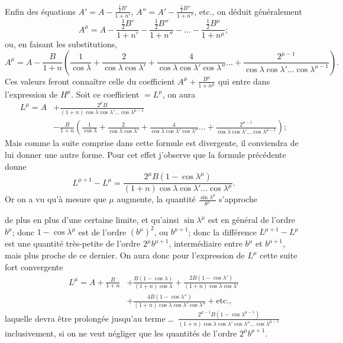 \documentclass{article}
\begin{document}
Enfin des équations $A'=A-\frac{\frac{1}{2}B'}{1+n'}$, $A''=A'-\frac{\frac{1}{2}B''}{1+n''}$, etc., on déduit généralement
\[ A^{\mu}=A-\frac{\tfrac{1}{2}B'}{1+n'}-\frac{\tfrac{1}{2}B''}{1+n''}-\ldots-\frac{\tfrac{1}{2}B^{\mu}}{1+n^{\mu}}; \]
ou, en faisant les substitutions,
\[ A^{\mu}=A-\frac{B}{1+n}\left(\frac{1}{\cos\lambda}+\frac{2}{\cos\lambda\cos\lambda'}+\frac{4}{\cos\lambda\cos\lambda'\cos\lambda''}\ldots+\frac{2^{\mu-1}}{\cos\lambda\cos\lambda'\ldots\cos\lambda^{\mu-1}}\right). \]
Ces valeurs feront connaître celle du coefficient $A^{\mu}+\frac{B^{\mu}}{1+n^{\mu}}$ qui entre dans l'expression de $H^{\mu}$. Soit ce coefficient $=L^{\mu}$, on aura
\[ \begin{aligned} L^{\mu}=A&+\frac{2^{\mu}B}{(1+n)\cos\lambda\cos\lambda'\ldots\cos\lambda^{\mu-1}}\\ &-\frac{B}{1+n}\left(\frac{1}{\cos\lambda}+\frac{2}{\cos\lambda\cos\lambda'}+\frac{4}{\cos\lambda\cos\lambda'\cos\lambda''}\ldots+\frac{2^{\mu-1}}{\cos\lambda\cos\lambda'\ldots\cos\lambda^{\mu-1}}\right); \end{aligned} \]
Mais comme la suite comprise dans cette formule est divergente, il conviendra de lui donner une autre forme. Pour cet effet j'observe que la formule précédente donne
\[ L^{\mu+1}-L^{\mu}=\frac{2^{\mu}B(1-\cos\lambda^{\mu})}{(1+n)\cos\lambda\cos\lambda'\ldots\cos\lambda^{\mu}}. \]
Or on a vu qu'à mesure que $\mu$ augmente, la quantité $\frac{\sin\lambda^{\mu}}{b^{\mu}}$ s'approche

de plus en plus d'une certaine limite, et qu'ainsi $\sin\lambda^{\mu}$ est en général de l'ordre $b^{\mu}$; donc $1-\cos\lambda^{\mu}$ est de l'ordre $(b^{\mu})^{2}$, ou $b^{\mu+1}$; donc la différence $L^{\mu+1}-L^{\mu}$ est une quantité très-petite de l'ordre $2^{\mu}b^{\mu+1}$, intermédiaire entre $b^{\mu}$ et $b^{\mu+1}$, mais plus proche de ce dernier. On aura donc pour l'expression de $L^{\mu}$ cette suite fort convergente
\[ \begin{aligned} L^{\mu}=A+\frac{B}{1+n}&+\frac{B(1-\cos\lambda)}{(1+n)\cos\lambda}+\frac{2B(1-\cos\lambda')}{(1+n)\cos\lambda\cos\lambda'}\\ &+\frac{4B(1-\cos\lambda'')}{(1+n)\cos\lambda\cos\lambda'\cos\lambda''}+\text{etc.}, \end{aligned} \]
laquelle devra être prolongée jusqu'au terme \ldots\ $\frac{2^{\mu-1}B(1-\cos\lambda^{\mu-1})}{(1+n)\cos\lambda\cos\lambda'\cos\lambda''\ldots\cos\lambda^{\mu-1}}$ inclusivement, si on ne veut négliger que les quantités de l'ordre $2^{\mu}b^{\mu+1}$.
\end{document}
